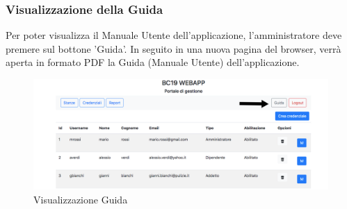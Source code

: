 \subsubsection{Visualizzazione della Guida}
Per poter visualizza il Manuale Utente dell'applicazione, l'amministratore deve premere sul bottone 'Guida'. In seguito in una nuova pagina del browser, verrà aperta in formato PDF la Guida (Manuale Utente) dell'applicazione.
\begin{figure}[H]
	\centering
	\includegraphics[width=15cm]{res/images/guida.jpg}
	\caption{Visualizzazione Guida}
\end{figure}
